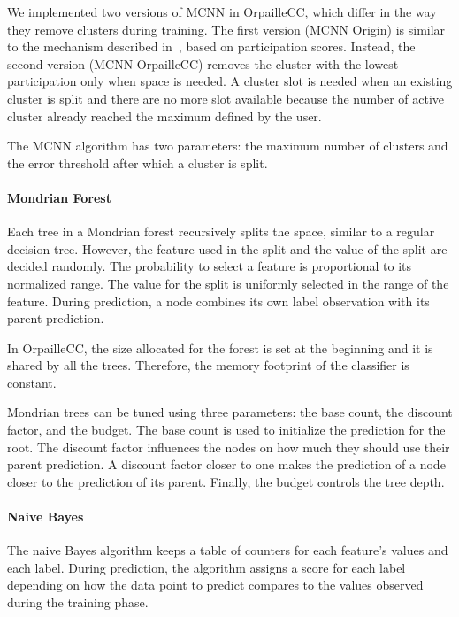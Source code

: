 We implemented two versions of MCNN in OrpailleCC,
which differ in the way they remove clusters
during training. The first version (MCNN Origin)
is similar to the mechanism described
in~\cite{mc-nn}, based on participation scores.
Instead, the second version (MCNN OrpailleCC)
removes the cluster with the lowest participation
only when space is needed.  A cluster slot is
needed when an existing cluster is split and there are
no more slot available because the number of
active cluster already reached the maximum defined
by the user.

The MCNN algorithm has two
parameters: the maximum number of clusters and the
error threshold after which a cluster is split. 


\paragraph{Mondrian Forest~\cite{mondrian2014}}
Each tree in a Mondrian forest recursively
splits the space, similar to a regular decision tree.
However, the feature used in the split and the value of the
split are decided randomly. The probability to select a feature is 
proportional to its normalized range. The value for the split is
uniformly selected in the range of the feature. During prediction, a node
combines its own label observation  with its parent prediction.

In OrpailleCC, the size allocated for the forest
is set at the beginning and it is shared by all
the trees.  Therefore, the memory footprint of the
classifier is constant.

Mondrian trees can be tuned using three
parameters: the base count, the discount factor,
and the budget. The base count is used to
initialize the prediction for the root. The
discount factor influences the nodes on how much
they should use their parent prediction. A
discount factor closer to one makes the prediction
of a node closer to the prediction of its parent.
Finally, the budget controls the tree depth.

\paragraph{Naive Bayes~\cite{naive_bayes}}
The naive Bayes algorithm keeps a table of
counters for each feature's values and each label.
During prediction, the algorithm assigns a
score for each label depending on how the data
point to predict compares to the values observed
during the training phase.

